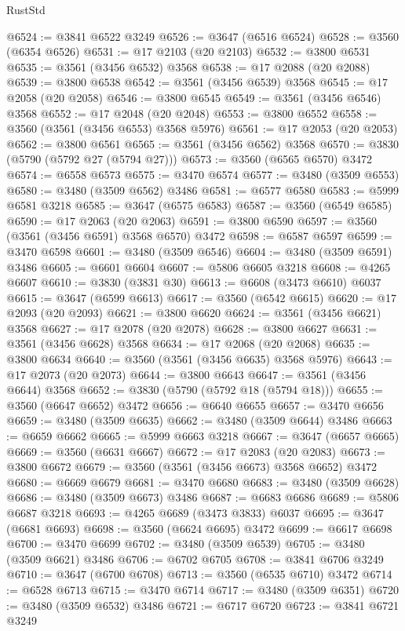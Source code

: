 \begin{lexlean}{RustStd}
\begin{coremodule}
{\begin{coremodule}
{{{{{{{{{{{{{{{{{{{{{{{{{{{{{{{{{{{{{{{{{{{{{@6524 := @3841 @6522 @3249
@6526 := @3647 (@6516 @6524)
@6528 := @3560 (@6354 @6526)
@6531 := @17 @2103 (@20 @2103)
@6532 := @3800 @6531
@6535 := @3561 (@3456 @6532) @3568
@6538 := @17 @2088 (@20 @2088)
@6539 := @3800 @6538
@6542 := @3561 (@3456 @6539) @3568
@6545 := @17 @2058 (@20 @2058)
@6546 := @3800 @6545
@6549 := @3561 (@3456 @6546) @3568
@6552 := @17 @2048 (@20 @2048)
@6553 := @3800 @6552
@6558 := @3560 (@3561 (@3456 @6553) @3568 @5976)
@6561 := @17 @2053 (@20 @2053)
@6562 := @3800 @6561
@6565 := @3561 (@3456 @6562) @3568
@6570 := @3830 (@5790 (@5792 @27 (@5794 @27)))
@6573 := @3560 (@6565 @6570) @3472
@6574 := @6558 @6573
@6575 := @3470 @6574
@6577 := @3480 (@3509 @6553)
@6580 := @3480 (@3509 @6562) @3486
@6581 := @6577 @6580
@6583 := @5999 @6581 @3218
@6585 := @3647 (@6575 @6583)
@6587 := @3560 (@6549 @6585)
@6590 := @17 @2063 (@20 @2063)
@6591 := @3800 @6590
@6597 := @3560 (@3561 (@3456 @6591) @3568 @6570) @3472
@6598 := @6587 @6597
@6599 := @3470 @6598
@6601 := @3480 (@3509 @6546)
@6604 := @3480 (@3509 @6591) @3486
@6605 := @6601 @6604
@6607 := @5806 @6605 @3218
@6608 := @4265 @6607
@6610 := @3830 (@3831 @30)
@6613 := @6608 (@3473 @6610) @6037
@6615 := @3647 (@6599 @6613)
@6617 := @3560 (@6542 @6615)
@6620 := @17 @2093 (@20 @2093)
@6621 := @3800 @6620
@6624 := @3561 (@3456 @6621) @3568
@6627 := @17 @2078 (@20 @2078)
@6628 := @3800 @6627
@6631 := @3561 (@3456 @6628) @3568
@6634 := @17 @2068 (@20 @2068)
@6635 := @3800 @6634
@6640 := @3560 (@3561 (@3456 @6635) @3568 @5976)
@6643 := @17 @2073 (@20 @2073)
@6644 := @3800 @6643
@6647 := @3561 (@3456 @6644) @3568
@6652 := @3830 (@5790 (@5792 @18 (@5794 @18)))
@6655 := @3560 (@6647 @6652) @3472
@6656 := @6640 @6655
@6657 := @3470 @6656
@6659 := @3480 (@3509 @6635)
@6662 := @3480 (@3509 @6644) @3486
@6663 := @6659 @6662
@6665 := @5999 @6663 @3218
@6667 := @3647 (@6657 @6665)
@6669 := @3560 (@6631 @6667)
@6672 := @17 @2083 (@20 @2083)
@6673 := @3800 @6672
@6679 := @3560 (@3561 (@3456 @6673) @3568 @6652) @3472
@6680 := @6669 @6679
@6681 := @3470 @6680
@6683 := @3480 (@3509 @6628)
@6686 := @3480 (@3509 @6673) @3486
@6687 := @6683 @6686
@6689 := @5806 @6687 @3218
@6693 := @4265 @6689 (@3473 @3833) @6037
@6695 := @3647 (@6681 @6693)
@6698 := @3560 (@6624 @6695) @3472
@6699 := @6617 @6698
@6700 := @3470 @6699
@6702 := @3480 (@3509 @6539)
@6705 := @3480 (@3509 @6621) @3486
@6706 := @6702 @6705
@6708 := @3841 @6706 @3249
@6710 := @3647 (@6700 @6708)
@6713 := @3560 (@6535 @6710) @3472
@6714 := @6528 @6713
@6715 := @3470 @6714
@6717 := @3480 (@3509 @6351)
@6720 := @3480 (@3509 @6532) @3486
@6721 := @6717 @6720
@6723 := @3841 @6721 @3249
}}}}}}}}}}}}}}}}}}}}}}}}}}}}}}}}}}}}}}}}}}}}}
\end{coremodule}}
\end{coremodule}
\end{lexlean}
